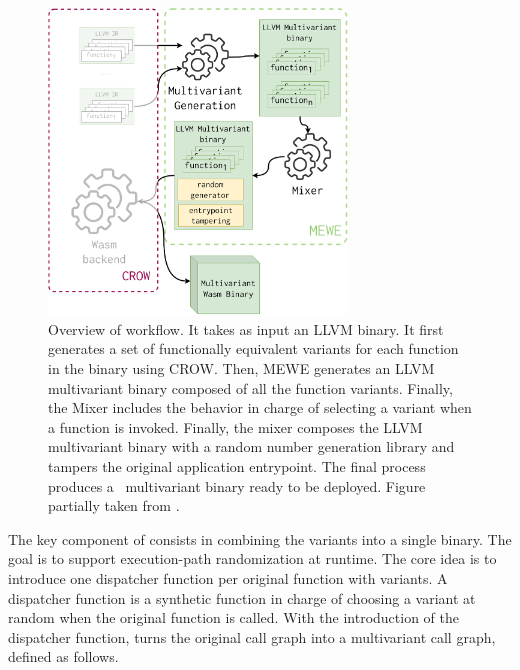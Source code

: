 \begin{figure}
  \centering
  \includegraphics[height=3.2in]{diagrams/MEWE.pdf}
  \caption{Overview of \tool workflow. It takes as input an LLVM binary. It first generates a set of functionally equivalent variants for each function in the binary using CROW. Then, MEWE generates an LLVM multivariant binary composed of all the function variants. Finally, the Mixer includes the behavior in charge of selecting a variant when a function is invoked. Finally, the \tool mixer composes the LLVM multivariant binary with a random number generation library and tampers the original application entrypoint. The final process produces a \wasm\ multivariant binary ready to be deployed. Figure partially taken from \cite{Lic}. }
  \label{workflow}
\end{figure}




The key component of \tool consists in combining the variants into a single binary.
The goal is to support execution-path randomization at runtime.
The core idea is to introduce one dispatcher function per original function with variants.
A dispatcher function is a synthetic function in charge of choosing a variant at random when the original function is called.
With the introduction of the dispatcher function,  \tool turns the original call graph into a multivariant call graph, defined as follows. 


